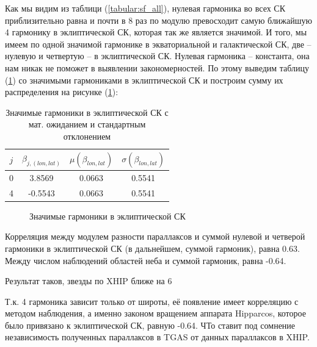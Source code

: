 \documentclass[14pt]{article} %
\begin{document}
Как мы видим из таблици (\ref{tabular:sf_all}), нулевая гармоника во всех СК приблизительно равна и почти в 8 раз по модулю превосходит самую ближайшую 4 гармонику в эклиптической СК, которая так же является значимой. И того, мы имеем по одной значимой гармонике в экваториальной и галактической СК, две -- нулевую и четвертую -- в эклиптической СК. Нулевая гармоника -- константа, она нам никак не поможет  в выявлении закономерностей. По этому выведим таблицу (\ref{tabular:sf_04}) со значимыми гармониками в эклиптической СК и построим сумму их распределения на рисунке (\ref{img:sfff}):

\begin{table}[h]
\centering
\caption{Значимые гармоники в эклиптической СК с мат. ожиданием и стандартным отклонением}
\label{tabular:sf_04}
\begin{tabular}{|c|c|c|c|}
\hline 	
$j$ &$\beta_{j,(lon,lat)}$ & $\mu(\beta_{lon,lat})$ & $\sigma(\beta_{lon,lat})$\\
\hline 	
0 &3.8569 &0.0663 &0.5541\\
4 &-0.5543 &0.0663 &0.5541\\
\hline 	
\end{tabular}
\end{table}

\begin{figure}[h!]
\caption{Значимые гармоники в эклиптической СК}
\label{img:sfff}
\end{figure}

Корреляция между модулем разности параллаксов и суммой нулевой и четверой гармоники в эклиптической СК (в дальнейшем, суммой гармоник), равна 0.63. Между числом наблюдений областей неба и суммой гармоник, равна -0.64.

Результат таков, звезды по XHIP ближе на 6%

Т.к. 4 гармоника зависит только от широты, её появление имеет корреляцию с методом наблюдения, а именно законом вращением аппарата Hipparcos, которое было привязано к эклиптической СК, равную -0.64. ЧТо ставит под сомнение независимость полученных параллаксов в TGAS от данных параллаксов в XHIP.
\end{document}
